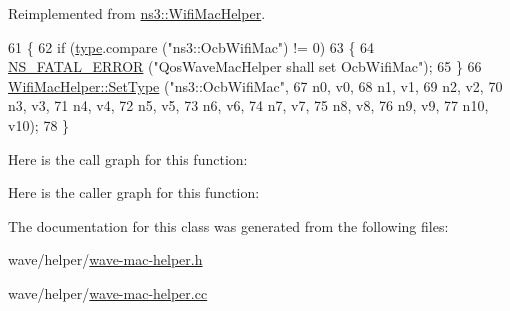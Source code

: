 Reimplemented from \hyperlink{classns3_1_1WifiMacHelper_a382d8df76a1dd7007179d1963b4b6bc6}{ns3\+::\+Wifi\+Mac\+Helper}.


\begin{DoxyCode}
61 \{
62   \textcolor{keywordflow}{if} (\hyperlink{visualizer-ideas_8txt_add98db9e15e2a58cf2b57623e7aa893a}{type}.compare (\textcolor{stringliteral}{"ns3::OcbWifiMac"}) != 0)
63     \{
64       \hyperlink{group__fatal_ga5131d5e3f75d7d4cbfd706ac456fdc85}{NS\_FATAL\_ERROR} (\textcolor{stringliteral}{"QosWaveMacHelper shall set OcbWifiMac"});
65     \}
66   \hyperlink{classns3_1_1WifiMacHelper_a382d8df76a1dd7007179d1963b4b6bc6}{WifiMacHelper::SetType} (\textcolor{stringliteral}{"ns3::OcbWifiMac"},
67                               n0, v0,
68                               n1, v1,
69                               n2, v2,
70                               n3, v3,
71                               n4, v4,
72                               n5, v5,
73                               n6, v6,
74                               n7, v7,
75                               n8, v8,
76                               n9, v9,
77                               n10, v10);
78 \}
\end{DoxyCode}


Here is the call graph for this function\+:




Here is the caller graph for this function\+:




The documentation for this class was generated from the following files\+:\begin{DoxyCompactItemize}
\item 
wave/helper/\hyperlink{wave-mac-helper_8h}{wave-\/mac-\/helper.\+h}\item 
wave/helper/\hyperlink{wave-mac-helper_8cc}{wave-\/mac-\/helper.\+cc}\end{DoxyCompactItemize}
